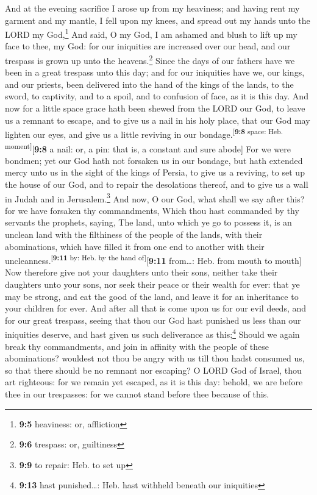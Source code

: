  And at the evening sacrifice I arose up from my
heaviness; and having rent my garment and my mantle, I fell upon my
knees, and spread out my hands unto the LORD my God,\footnote{\textbf{9:5}
  heaviness: or, affliction}  And said, O my God, I am
ashamed and blush to lift up my face to thee, my God: for our iniquities
are increased over our head, and our trespass is grown up unto the
heavens.\footnote{\textbf{9:6} trespass: or, guiltiness} 
Since the days of our fathers have we been in a great trespass unto this
day; and for our iniquities have we, our kings, and our priests, been
delivered into the hand of the kings of the lands, to the sword, to
captivity, and to a spoil, and to confusion of face, as it is this day.
 And now for a little space grace hath been shewed from
the LORD our God, to leave us a remnant to escape, and to give us a nail
in his holy place, that our God may lighten our eyes, and give us a
little reviving in our bondage.\textsuperscript{{[}\textbf{9:8} space:
Heb. moment{]}}{[}\textbf{9:8} a nail: or, a pin: that is, a constant
and sure abode{]}  For we were bondmen; yet our God hath
not forsaken us in our bondage, but hath extended mercy unto us in the
sight of the kings of Persia, to give us a reviving, to set up the house
of our God, and to repair the desolations thereof, and to give us a wall
in Judah and in Jerusalem.\footnote{\textbf{9:9} to repair: Heb. to set
  up}  And now, O our God, what shall we say after this?
for we have forsaken thy commandments,  Which thou hast
commanded by thy servants the prophets, saying, The land, unto which ye
go to possess it, is an unclean land with the filthiness of the people
of the lands, with their abominations, which have filled it from one end
to another with their uncleanness.\textsuperscript{{[}\textbf{9:11} by:
Heb. by the hand of{]}}{[}\textbf{9:11} from\ldots: Heb. from mouth to
mouth{]}  Now therefore give not your daughters unto
their sons, neither take their daughters unto your sons, nor seek their
peace or their wealth for ever: that ye may be strong, and eat the good
of the land, and leave it for an inheritance to your children for ever.
 And after all that is come upon us for our evil deeds,
and for our great trespass, seeing that thou our God hast punished us
less than our iniquities deserve, and hast given us such deliverance as
this;\footnote{\textbf{9:13} hast punished\ldots: Heb. hast withheld
  beneath our iniquities}  Should we again break thy
commandments, and join in affinity with the people of these
abominations? wouldest not thou be angry with us till thou hadst
consumed us, so that there should be no remnant nor escaping?
 O LORD God of Israel, thou art righteous: for we remain
yet escaped, as it is this day: behold, we are before thee in our
trespasses: for we cannot stand before thee because of this.

